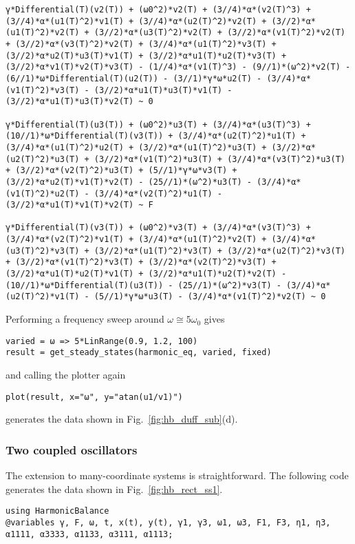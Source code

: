 \begin{lstlisting}[numbers=none, basicstyle=\scriptsize\ttfamily]
γ*Differential(T)(v2(T)) + (ω0^2)*v2(T) + (3//4)*α*(v2(T)^3) + (3//4)*α*(u1(T)^2)*v1(T) + (3//4)*α*(u2(T)^2)*v2(T) + (3//2)*α*(u1(T)^2)*v2(T) + (3//2)*α*(u3(T)^2)*v2(T) + (3//2)*α*(v1(T)^2)*v2(T) + (3//2)*α*(v3(T)^2)*v2(T) + (3//4)*α*(u1(T)^2)*v3(T) + (3//2)*α*u2(T)*u3(T)*v1(T) + (3//2)*α*u1(T)*u2(T)*v3(T) + (3//2)*α*v1(T)*v2(T)*v3(T) - (1//4)*α*(v1(T)^3) - (9//1)*(ω^2)*v2(T) - (6//1)*ω*Differential(T)(u2(T)) - (3//1)*γ*ω*u2(T) - (3//4)*α*(v1(T)^2)*v3(T) - (3//2)*α*u1(T)*u3(T)*v1(T) - (3//2)*α*u1(T)*u3(T)*v2(T) ~ 0

γ*Differential(T)(u3(T)) + (ω0^2)*u3(T) + (3//4)*α*(u3(T)^3) + (10//1)*ω*Differential(T)(v3(T)) + (3//4)*α*(u2(T)^2)*u1(T) + (3//4)*α*(u1(T)^2)*u2(T) + (3//2)*α*(u1(T)^2)*u3(T) + (3//2)*α*(u2(T)^2)*u3(T) + (3//2)*α*(v1(T)^2)*u3(T) + (3//4)*α*(v3(T)^2)*u3(T) + (3//2)*α*(v2(T)^2)*u3(T) + (5//1)*γ*ω*v3(T) + (3//2)*α*u2(T)*v1(T)*v2(T) - (25//1)*(ω^2)*u3(T) - (3//4)*α*(v1(T)^2)*u2(T) - (3//4)*α*(v2(T)^2)*u1(T) - (3//2)*α*u1(T)*v1(T)*v2(T) ~ F

γ*Differential(T)(v3(T)) + (ω0^2)*v3(T) + (3//4)*α*(v3(T)^3) + (3//4)*α*(v2(T)^2)*v1(T) + (3//4)*α*(u1(T)^2)*v2(T) + (3//4)*α*(u3(T)^2)*v3(T) + (3//2)*α*(u1(T)^2)*v3(T) + (3//2)*α*(u2(T)^2)*v3(T) + (3//2)*α*(v1(T)^2)*v3(T) + (3//2)*α*(v2(T)^2)*v3(T) + (3//2)*α*u1(T)*u2(T)*v1(T) + (3//2)*α*u1(T)*u2(T)*v2(T) - (10//1)*ω*Differential(T)(u3(T)) - (25//1)*(ω^2)*v3(T) - (3//4)*α*(u2(T)^2)*v1(T) - (5//1)*γ*ω*u3(T) - (3//4)*α*(v1(T)^2)*v2(T) ~ 0
\end{lstlisting}

Performing a frequency sweep around $\omega \cong 5 \omega_0$ gives
%
\begin{lstlisting}[numbers=none]
varied = ω => 5*LinRange(0.9, 1.2, 100)
result = get_steady_states(harmonic_eq, varied, fixed)
\end{lstlisting}
%
and calling the plotter again
\begin{lstlisting}[numbers=none]
plot(result, x="ω", y="atan(u1/v1)")
\end{lstlisting}
generates the data shown in Fig.~\ref{fig:hb_duff_sub}(d).

\subsubsection{Two coupled oscillators} 

The extension to many-coordinate systems is straightforward. The following code generates the data shown in Fig.~\ref{fig:hb_rect_ss1}. 
\begin{lstlisting}[numbers=none]
using HarmonicBalance
@variables γ, F, ω, t, x(t), y(t), γ1, γ3, ω1, ω3, F1, F3, η1, η3, α1111, α3333, α1133, α3111, α1113;
\end{lstlisting}

